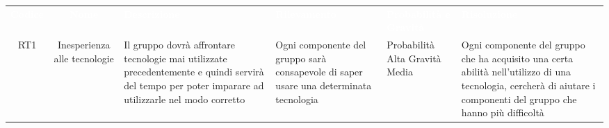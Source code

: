 {
\renewcommand{\arraystretch}{1.5}
\centering
\begin{longtable}{ c c  C{4cm}  C{3cm} C{4cm}}
\textcolor{white}{\textbf{Codice}} & \textcolor{white}{\textbf{Nome}} & \textcolor{white}{\textbf{Descrizione}} & \textcolor{white}{\textbf{Rilevamento}} & \textcolor{white}{\textbf{Probabilità e Gravità}} & \textcolor{white}{\textbf{Risoluzione}}\\	

RT1 & Inesperienza alle tecnologie & Il gruppo dovrà affrontare tecnologie mai utilizzate precedentemente e quindi servirà del tempo per poter imparare ad utilizzarle nel modo corretto & Ogni componente del gruppo sarà consapevole di saper usare una determinata tecnologia & Probabilità Alta Gravità Media & Ogni componente del gruppo che ha acquisito una certa abilità nell'utilizzo di una tecnologia, cercherà di aiutare i componenti del gruppo che hanno più difficoltà \\
		

\end{longtable}
}